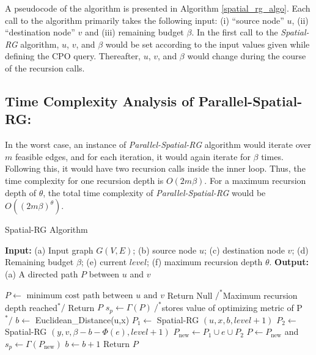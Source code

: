 A pseudocode of the algorithm is presented in Algorithm \ref{spatial_rg_algo}. Each call to the algorithm primarily takes the following input: (i) “source node” $u$, (ii) “destination node” $v$ and (iii) remaining budget $\beta$. In the first call to the \textit{Spatial-RG} algorithm, $u$, $v$, and $\beta$ would be set according to the input values given while defining the CPO query. Thereafter, $u$, $v$, and $\beta$ would change during the course of the recursion calls.

\subsection{Time Complexity Analysis of Parallel-Spatial-RG:}

In the worst case, an instance of \textit{Parallel-Spatial-RG} algorithm would iterate over $m$ feasible edges, and for each iteration, it would again iterate for $\beta$ times. Following this, it would have two recursion calls inside the inner loop. Thus, the time complexity for one recursion depth is $O(2m\beta)$. For a maximum recursion depth of $\theta$, the total time complexity of \textit{Parallel-Spatial-RG} would be $O((2m\beta)^\theta )$.

\begin{algorithm}
\caption{Spatial-RG Algorithm} \label{spatial_rg_algo}
\textbf{Input: }(a) Input graph $G(V, E)$; (b) source node $u$; (c) destination node $v$; (d) Remaining budget $\beta$; (e) current $level$; (f) maximum recursion depth $\theta$.\newline
\textbf{Output: }(a) A directed path $P$ between $u$ and $v$\newline
\begin{algorithmic}[1]
\State $P \leftarrow \textrm{ minimum cost path between } u \textrm{ and } v$
    \State Return Null
\EndIf
{} $/^*$Maximum recursion depth reached$^*/$
    \State Return $P$
\EndIf
\State $s_p \leftarrow \Gamma(P)~/^*$stores value of optimizing metric of P $^*/$
    \State $b \leftarrow$ Euclidean\_Distance(u,x)
        \State $P_1 \leftarrow$ Spatial-RG $(u, x, b, level + 1)$
        \State $P_2 \leftarrow$ Spatial-RG $(y, v, \beta - b - \Phi (e), level + 1)$
        \State $P_\mathrm{new} \leftarrow P_1 \cup e \cup P_2$
            \State $P \leftarrow P_\mathrm{new}$ and $s_p \leftarrow \Gamma(P_\mathrm{new})$
        \EndIf
        \State $b \leftarrow b+1$
    \EndWhile
\EndFor
\State Return $P$
\end{algorithmic}
\end{algorithm}